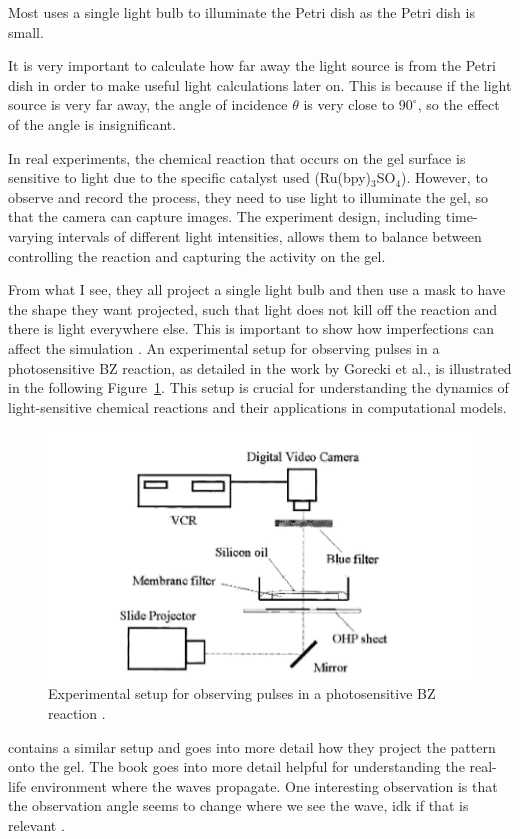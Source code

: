 Most uses a single light bulb to illuminate the Petri dish as the Petri dish is small. 

It is very important to calculate how far away the light source is from the Petri dish in order to make useful light calculations later on. This is because if the light source is very far away, the angle of incidence $\theta$ is very close to $90^\circ$, so the effect of the angle is insignificant.

In real experiments, the chemical reaction that occurs on the gel surface is sensitive to light due to the specific catalyst used (Ru(bpy)$_3$SO$_4$). 
However, to observe and record the process, they need to use light to illuminate the gel, so that the camera can capture images. The experiment design, including time-varying intervals of different light intensities, allows them to balance between controlling the reaction and capturing the activity on the gel. \cite{TOTH20091605}

From what I see, they all project a single light bulb and then use a mask to have the shape they want projected, such that light does not kill off the reaction and there is light everywhere else. This is important to show how imperfections can affect the simulation . \cite{gorecki2003chemical}
An experimental setup for observing pulses in a photosensitive BZ reaction, as detailed in the work by Gorecki et al., is illustrated in the following Figure~\ref{fig:gorecki-setup}. This setup is crucial for understanding the dynamics of light-sensitive chemical reactions and their applications in computational models.

\begin{figure}[H]
    \centering
    \includegraphics[width=0.7\linewidth]{images/Screenshot 2024-03-10 at 20.23.20.png}
    \caption{Experimental setup for observing pulses in a photosensitive BZ reaction \citep{gorecki2003chemical}.}
    \label{fig:gorecki-setup}
\end{figure}

\cite[71]{cui2004synchronization} contains a similar setup and goes into more detail how they project the pattern onto the gel. 
The book goes into more detail helpful for understanding the real-life environment where the waves propagate. 
One interesting observation is that the observation angle seems to change where we see the wave, idk if that is relevant \citep{cui2004synchronization}.

